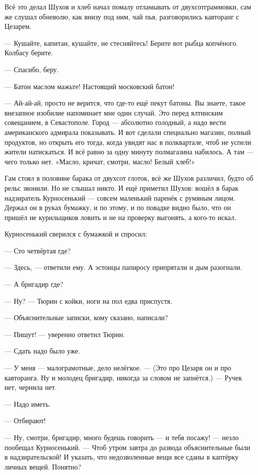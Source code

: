 Всё это делал Шухов и хлеб начал помалу отламывать от двухсотграммовки, сам же слушал
обневолю, как внизу под ним, чай пья, разговорились кавторанг с Цезарем.

--- Кушайте, капитан, кушайте, не стесняйтесь! Берите вот рыбца копчёного. Колбасу берите.

--- Спасибо, беру.

--- Батон маслом мажьте! Настоящий московский батон!

--- Ай-ай-ай, просто не верится, что где-то ещё пекут батоны. Вы знаете, такое внезапное
изобилие напоминает мне один случай. Это перед ялтинским совещанием, в Севастополе. Город ---
абсолютно голодный, а надо вести американского адмирала показывать. И вот сделали
специально магазин, полный продуктов, но открыть его тогда, когда увидят нас в полквартале,
чтоб не успели жители натискаться. И всё равно за одну минуту полмагазина набилось. А там ---
чего только нет. «Масло, кричат, смотри, масло! Белый хлеб!»

Гам стоял в половине барака от двухсот глоток, всё же Шухов различил, будто об рельс звонили.
Но не слышал никто. И ещё приметил Шухов: вошёл в барак надзиратель Курносенький --- совсем
маленький паренёк с румяным лицом. Держал он в руках бумажку, и по этому, и по повадке видно
было, что он пришёл не курильщиков ловить и не на проверку выгонять, а кого-то искал.

Курносенький сверился с бумажкой и спросил:

--- Сто четвёртая где?

--- Здесь, --- ответили ему. А эстонцы папиросу припрятали и дым разогнали.

--- А бригадир где?

--- Ну? --- Тюрин с койки, ноги на пол едва приспустя.

--- Объяснительные записки, кому сказано, написали?

--- Пишут! --- уверенно ответил Тюрин.

--- Сдать надо было уже.

--- У меня --- малограмотные, дело нелёгкое. --- (Это про Цезаря он и про кавторанга. Ну и молодец
бригадир, никогда за словом не запнётся.) --- Ручек нет, чернила нет.

--- Надо иметь.

--- Отбирают!

--- Ну, смотри, бригадир, много будешь говорить --- и тебя посажу! --- незло пообещал
Курносенький. --- Чтоб утром завтра до развода объяснительные были в надзирательской! И
указать, что недозволенные вещи все сданы в каптёрку личных вещей. Понятно?

